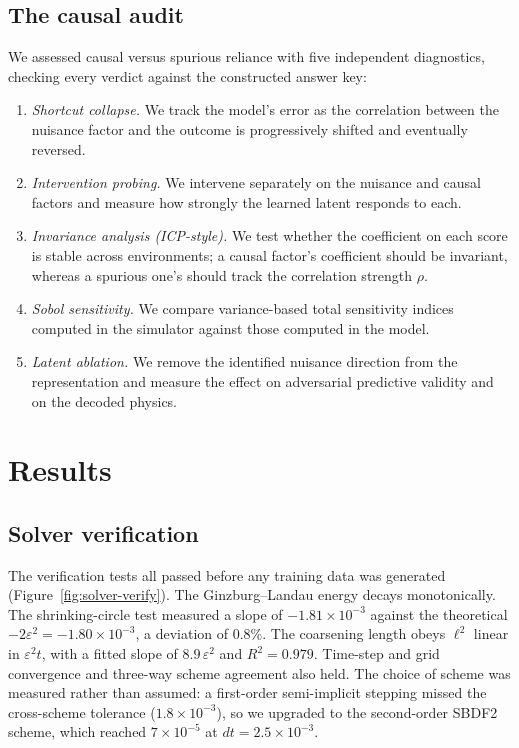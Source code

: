 \documentclass[11pt]{article}
\begin{document}
\subsection{The causal audit}

We assessed causal versus spurious reliance with five independent diagnostics, checking every
verdict against the constructed answer key:
\begin{enumerate}
\item \emph{Shortcut collapse.} We track the model's error as the correlation between the nuisance
factor and the outcome is progressively shifted and eventually reversed.
\item \emph{Intervention probing.} We intervene separately on the nuisance and causal factors and
measure how strongly the learned latent responds to each.
\item \emph{Invariance analysis (ICP-style).} We test whether the coefficient on each score is
stable across environments; a causal factor's coefficient should be invariant, whereas a spurious
one's should track the correlation strength $\rho$.
\item \emph{Sobol sensitivity.} We compare variance-based total sensitivity indices computed in the
simulator against those computed in the model.
\item \emph{Latent ablation.} We remove the identified nuisance direction from the representation
and measure the effect on adversarial predictive validity and on the decoded physics.
\end{enumerate}

\section{Results}

\subsection{Solver verification}
\label{sec:solver-results}

The verification tests all passed before any training data was generated
(Figure~\ref{fig:solver-verify}). The Ginzburg--Landau energy decays monotonically. The
shrinking-circle test measured a slope of $-1.81\times10^{-3}$ against the theoretical
$-2\varepsilon^2 = -1.80\times10^{-3}$, a deviation of $0.8\%$. The coarsening length obeys
$\ell^2$ linear in $\varepsilon^2 t$, with a fitted slope of $8.9\,\varepsilon^2$ and
$R^2 = 0.979$. Time-step and grid convergence and three-way scheme agreement also held. The choice
of scheme was measured rather than assumed: a first-order semi-implicit stepping missed the
cross-scheme tolerance ($1.8\times10^{-3}$), so we upgraded to the second-order SBDF2 scheme, which
reached $7\times10^{-5}$ at $dt = 2.5\times10^{-3}$.
\end{document}
